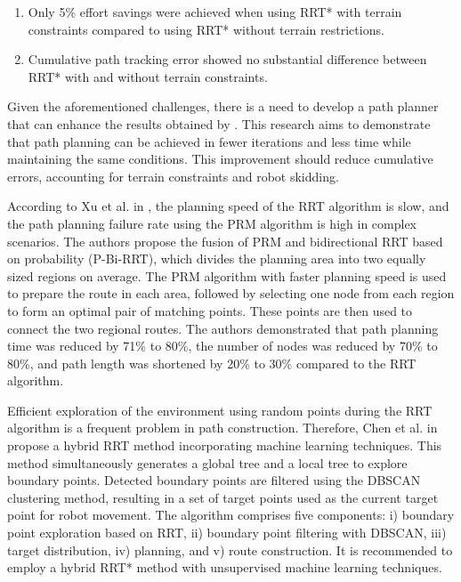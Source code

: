 \documentclass[conference]{IEEEtran}
\begin{document}
\begin{enumerate}
  \item Only 5\% effort savings were achieved when using RRT* with terrain constraints compared to using RRT* without terrain restrictions.
  \item Cumulative path tracking error showed no substantial difference between RRT* with and without terrain constraints.
\end{enumerate}

Given the aforementioned challenges, there is a need to develop a path planner that can enhance the results obtained by \cite{Auat2017}. This research aims to demonstrate that path planning can be achieved in fewer iterations and less time while maintaining the same conditions. This improvement should reduce cumulative errors, accounting for terrain constraints and robot skidding.

According to Xu et al. in \cite{Xu2020}, the planning speed of the RRT algorithm is slow, and the path planning failure rate using the PRM algorithm is high in complex scenarios. The authors propose the fusion of PRM and bidirectional RRT based on probability (P-Bi-RRT), which divides the planning area into two equally sized regions on average. The PRM algorithm with faster planning speed is used to prepare the route in each area, followed by selecting one node from each region to form an optimal pair of matching points. These points are then used to connect the two regional routes. The authors demonstrated that path planning time was reduced by 71\% to 80\%, the number of nodes was reduced by 70\% to 80\%, and path length was shortened by 20\% to 30\% compared to the RRT algorithm.

Efficient exploration of the environment using random points during the RRT algorithm is a frequent problem in path construction. Therefore, Chen et al. in \cite{Chen2020} propose a hybrid RRT method incorporating machine learning techniques. This method simultaneously generates a global tree and a local tree to explore boundary points. Detected boundary points are filtered using the DBSCAN clustering method, resulting in a set of target points used as the current target point for robot movement. The algorithm comprises five components: i) boundary point exploration based on RRT, ii) boundary point filtering with DBSCAN, iii) target distribution, iv) planning, and v) route construction. It is recommended to employ a hybrid RRT* method with unsupervised machine learning techniques.
\end{document}
